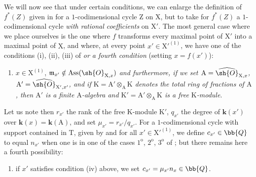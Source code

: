 \begin{env}[21.10.10]
\label{IV.21.10.10}
We will now see that under certain conditions, we can enlarge the definition of $f^*(Z)$ given in  for a $1$-codimensional cycle $\mathrm{Z}$ on $\mathrm{X}$, but to take for $f^*(Z)$ a $1$-codimensional cycle \emph{with rational coefficients} on $\mathrm{X}'$.
The most general case where we place ourselves is the one where $f$ transforms every maximal point of $\mathrm{X}'$ into a maximal point of $\mathrm{X}$, and where, at every point $x'\in\mathrm{X}'^{(1)}$, we have one of the conditions (i), (ii), (iii) of  \emph{or a fourth condition} (setting $x=f(x')$):
\begin{enumerate}
  \item[(iv)] $x\in\mathrm{X}^{(1)}$, $\mathfrak{m}_{x'}\notin\operatorname{Ass}(\sh{O}_{\mathrm{X},x})$ \emph{and furthermore, if we set $\mathrm{A}=\widehat{\sh{O}}_{\mathrm{X},x}$, $\mathrm{A}'=\widehat{\sh{O}}_{\mathrm{X}',x'}$, and if $\mathrm{K}=\mathrm{A}'\otimes_{\mathrm{A}}\mathrm{K}$ denotes the total ring of fractions of $\mathrm{A}$, then $\mathrm{A}'$ is a finite $\mathrm{A}$-algebra and $\mathrm{K}'=\mathrm{A}'\otimes_{\mathrm{A}}\mathrm{K}$ is a free $\mathrm{K}$-module}.
\end{enumerate}

Let us note then $r_{x'}$ the rank of the free $\mathrm{K}$-module $\mathrm{K}'$, $q_{x'}$ the degree of $\boldsymbol{k}(x')$ over $\boldsymbol{k}(x)=\boldsymbol{k}(\mathrm{A})$, and set $\mu_{x'}=r_{x'}/q_{x'}$.
For a $1$-codimensional cycle with support contained in $\mathrm{T}$, given by  and for all $x'\in\mathrm{X}'^{(1)}$, we define $c_{x'}\in\bb{Q}$ to equal $n_{x'}$ when one is in one of the cases $1^{\mathrm{o}}$, $2^{\mathrm{o}}$, $3^{\mathrm{o}}$ of ; but there remains here a fourth possibility:
\begin{enumerate}
  \item[$4^{\mathrm{o}}$] if $x'$ satisfies condition (iv) above, we set $c_{x'}=\mu_{x'}n_x\in\bb{Q}$.
\end{enumerate}
\end{env}

